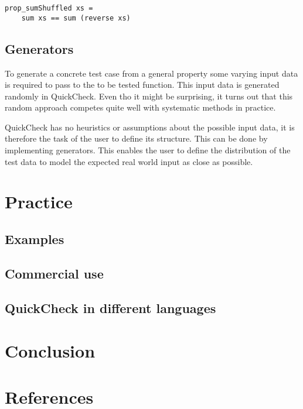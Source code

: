 \documentclass[a4paper, 12pt]{article} %
\begin{document}
\begin{verbatim}
prop_sumShuffled xs = 
    sum xs == sum (reverse xs)
\end{verbatim}

\subsection{Generators}

To generate a concrete test case from a general property some varying input data is required to pass to the to be tested function. This input data is generated randomly in QuickCheck. Even tho it might be surprising, it turns out that this random approach competes quite well with systematic methods in practice. \cite{Claessen2000}

QuickCheck has no heuristics or assumptions about the possible input data, it is therefore the task of the user to define its structure. This can be done by implementing generators. This enables the user to define the distribution of the test data to model the expected real world input as close as possible.

\section{Practice}

\subsection{Examples}

\subsection{Commercial use}

\subsection{QuickCheck in different languages}

\section{Conclusion}

\newpage
\section{References}
\printbibliography[heading=none]
\end{document}
